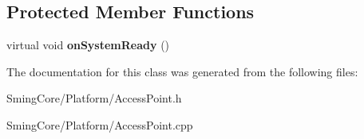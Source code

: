 \subsection*{Protected Member Functions}
\begin{DoxyCompactItemize}
\item 
\hypertarget{class_access_point_class_a3f1aa322373e757d6cd4b0d04724d091}{}virtual void {\bfseries on\+System\+Ready} ()\label{class_access_point_class_a3f1aa322373e757d6cd4b0d04724d091}

\end{DoxyCompactItemize}


The documentation for this class was generated from the following files\+:\begin{DoxyCompactItemize}
\item 
Sming\+Core/\+Platform/Access\+Point.\+h\item 
Sming\+Core/\+Platform/Access\+Point.\+cpp\end{DoxyCompactItemize}
